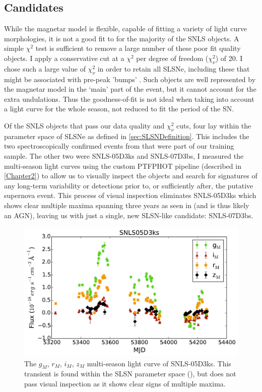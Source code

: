 \subsection{Candidates}
\label{sec:SLSNCands}
While the magnetar model is flexible, capable of fitting a variety of light curve morphologies, it is not a good fit to for the majority of the SNLS objects. A simple $\chi^2$ test is sufficient to remove a large number of these poor fit quality objects. I apply a conservative cut at a $\chi^2$ per degree of freedom ($\chi^2_{\nu}$) of 20. I chose such a large value of $\chi^2_{\nu}$ in order to retain all SLSNe, including these that might be associated with pre-peak 'bumps' \citep{Nicholl2015,Nicholl2015b,Smith2016}. Such objects are well represented by the magnetar model in the `main' part of the event, but it cannot account for the extra undulations. Thus the goodness-of-fit is not ideal when taking into account a light curve for the whole season, not reduced to fit the period of the SN.

Of the SNLS objects that pass our data quality and $\chi^2_{\nu}$ cuts, four lay within the parameter space of SLSNe as defined in \ref{sec:SLSNDefinition}. This includes the two spectroscopically confirmed events from \citet{Howell2013} that were part of our training sample. The other two were SNLS-05D3ks and SNLS-07D3bs, I  measured the multi-season light curves using the custom \textsc{PTFPHOT} pipeline (described in \cref{Chapter2}) to allow us to visually inspect the objects and search for signatures of any long-term variability or detections prior to, or sufficiently after, the putative supernova event. This process of visual inspection eliminates SNLS-05D3ks which shows clear multiple maxima spanning three years as seen in  (and is thus likely an AGN), leaving us with just a single, new SLSN-like candidate: SNLS-07D3bs.

\begin{figure}
\centering
\includegraphics[width=\textwidth]{Figures/Chapter4/SNLS05D3ks}
\caption{The $g_M$, $r_M$, $i_M$, $z_M$ multi-season light curve of SNLS-05D3ks. This transient is found within the SLSN parameter space (), but does not pass visual inspection as it shows clear signs of multiple maxima.}
\label{fig:05D3ks}
\end{figure}

